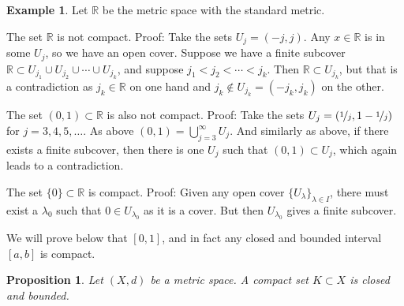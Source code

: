\documentclass[12pt,openany]{book}
\newcommand{\R}{{\mathbb{R}}}
\theoremstyle{plain}
\newtheorem{prop}[thm]{Proposition}
\theoremstyle{remark}
\theoremstyle{definition}
\theoremstyle{exercise}
\theoremstyle{example}
\newtheorem{example}[thm]{Example}
\begin{document}
\begin{example}
Let $\R$ be the metric space with the standard metric.

The set $\R$ is not compact.  Proof: Take the sets $U_j = (-j,j)$.
Any $x \in \R$ is in some $U_j$, so we have an open cover.
Suppose we have a finite
subcover $\R \subset U_{j_1} \cup U_{j_2} \cup \cdots \cup U_{j_k}$,
and suppose $j_1 < j_2 < \cdots < j_k$.  Then $\R \subset U_{j_k}$, but that is
a contradiction as $j_k \in \R$ on one hand and $j_k \notin U_{j_k} =
(-j_k,j_k)$ on the
other.

The set $(0,1) \subset \R$ is also not compact.  Proof:  Take the 
sets $U_{j} = (\nicefrac{1}{j},1-\nicefrac{1}{j})$ for $j=3,4,5,\ldots$.
As above $(0,1) = \bigcup_{j=3}^\infty U_j$.  And similarly as above,
if there exists a finite subcover, then there is one $U_j$ such that $(0,1)
\subset U_j$, which again leads to a contradiction.

The set $\{ 0 \} \subset \R$ is compact.  Proof: Given any open cover $\{
U_{\lambda} \}_{\lambda \in I}$, there must exist a $\lambda_0$ such that $0
\in U_{\lambda_0}$ as it is a cover.  But then $U_{\lambda_0}$ gives a
finite subcover.

We will prove below that $[0,1]$, and in fact any closed and bounded
interval $[a,b]$ is compact.
\end{example}

\begin{prop}
Let $(X,d)$ be a metric space.  A compact set $K \subset X$ is closed and
bounded.
\end{prop}
\end{document}
